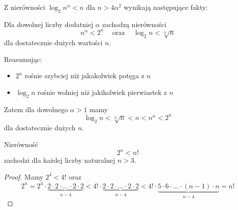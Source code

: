 \documentclass[a4paper,10pt]{beamer}
\begin{document}
\begin{frame}

Z nierówności $\log_2n^\alpha<n$ dla $n>4\alpha^2$ wynikają następujące fakty:

\bigskip

\begin{block}{}
Dla dowolnej liczby dodatniej $\alpha$ zachodzą nierówności
$$n^\alpha<2^n\ \ \ \ \mbox{ oraz }\ \ \ \ \log_2n<\sqrt[\alpha]{n}$$
dla dostatecznie dużych wartości $n$.
\end{block}

\bigskip

Reasumując:

\begin{itemize}
\item $2^n$ rośnie szybciej niż jakakolwiek potęga z $n$
\item $\log_2n$ rośnie wolniej niż jakikolwiek pierwiastek z $n$
\end{itemize}

\bigskip

Zatem dla dowolnego $\alpha>1$ mamy
$$\log_2n<\sqrt[\alpha]n<n<n^\alpha<2^n$$
dla dostatecznie dużych $n$.
\end{frame}




\begin{frame}
\begin{block}{}
Nierówność $$2^n<n!$$ zachodzi dla każdej liczby naturalnej $n>3$.
\end{block}{}

\begin{proof}
Mamy $2^4<4!$ oraz
$$2^n=2^4\cdot\underbrace{2\cdot2\cdot\ldots\cdot2\cdot2}_{n-4}<4!\cdot\underbrace{2\cdot2\cdot\ldots\cdot2\cdot2}_{n-4}<4!\cdot\underbrace{5\cdot6\cdot\ldots\cdot(n-1)\cdot n}_{n-4}=n!$$ 
\end{proof}
\end{frame}
\end{document}

